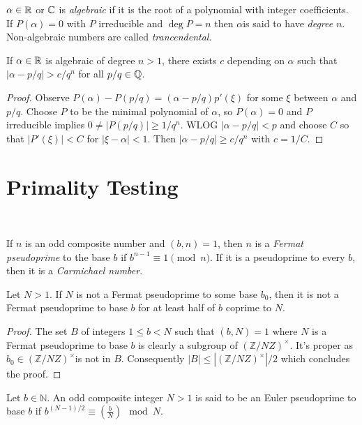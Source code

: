 \documentclass[a4paper, 10pt, twocolumn]{amsart}
\begin{document}
\begin{definition}
  $\alpha \in \mathbb{R}$ or $\mathbb{C}$ is \emph{algebraic} if it is the root of a polynomial with integer coefficients. If $P(\alpha) = 0$ with $P$ irreducible and $\deg P = n$ then $\alpha$is said to have \emph{degree} $n$. Non-algebraic numbers are called \emph{trancendental}.
\end{definition}

\begin{theorem}
If $\alpha \in \mathbb{R}$ is algebraic of degree $n > 1$, there exists $c$ depending on $\alpha$ such that $|\alpha - p/q| > c/q^n$ for all $p/q \in \mathbb{Q}$.
\end{theorem}
\begin{proof}
  Observe $P(\alpha) - P(p/q) = (\alpha - p/q)p'(\xi)$ for some $\xi$ between $\alpha$ and $p/q$. Choose $P$ to be the minimal polynomial of $\alpha$, so $P(\alpha) = 0$ and $P$ irreducible implies $0 \neq |P(p/q)| \geq 1/q^n$. WLOG $|\alpha - p/q| < p$ and choose $C$ so that $|P'(\xi)| < C$ for $|\xi - \alpha| < 1$. Then $|\alpha - p/q| \geq c/q^n$ with $c = 1/C$.
\end{proof}

\section{Primality Testing}
\ 

\begin{definition}
    If $n$ is an odd composite number and $(b, n) = 1$, then $n$ is a \emph{Fermat pseudoprime} to the base $b$ if $b^{n - 1} \equiv 1 \pmod{n}$. If it is a pseudoprime to every $b$, then it is a \emph{Carmichael number}.
\end{definition}

\begin{theorem}
  Let $N >1$. If $N$ is not a Fermat pseudoprime to some base $b_0$, then it is not a Fermat pseudoprime to base $b$ for at least half of $b$ coprime to $N$.
\end{theorem}
\begin{proof}
The set $B$ of integers $1 \leq b < N$ such that $(b, N) = 1$ where $N$ is a Fermat pseudoprime to base $b$ is clearly a subgroup of $(\mathbb{Z} / N Z)^{\times}$. It's proper as $b_0 \in(\mathbb{Z} / N Z)^{\times}$is not in $B$. Consequently $|B| \leq\left|(\mathbb{Z} / N Z)^{\times}\right| / 2$ which concludes the proof.
\end{proof}

\begin{definition}
Let $b \in \mathbb{N}$. An odd composite integer $N>1$ is said to be an Euler pseudoprime to base $b$ if $b^{(N-1) / 2} \equiv\left(\frac{b}{N}\right) \mod{N}$.
\end{definition}
\end{document}
